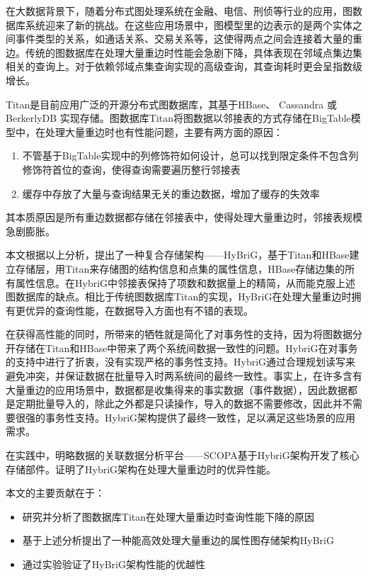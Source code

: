 
 \label{chap:conclusion}

在大数据背景下，随着分布式图处理系统在金融、电信、刑侦等行业的应用，图数据库系统迎来了新的挑战。在这些应用场景中，图模型里的边表示的是两个实体之间事件类型的关系，如通话关系、交易关系等，这使得两点之间会连接着大量的重边。传统的图数据库在处理大量重边时性能会急剧下降，具体表现在邻域点集边集相关的查询上。对于依赖邻域点集查询实现的高级查询，其查询耗时更会呈指数级增长。

Titan是目前应用广泛的开源分布式图数据库，其基于HBase、 Cassandra 或 BerkerlyDB 实现存储。图数据库Titan将图数据以邻接表的方式存储在BigTable模型中，在处理大量重边时也有性能问题，主要有两方面的原因：
\begin{enumerate}
    \item 不管基于BigTable实现中的列修饰符如何设计，总可以找到限定条件不包含列修饰符首位的查询，使得查询需要遍历整行邻接表
    \item 缓存中存放了大量与查询结果无关的重边数据，增加了缓存的失效率
\end{enumerate}
其本质原因是所有重边数据都存储在邻接表中，使得处理大量重边时，邻接表规模急剧膨胀。

本文根据以上分析，提出了一种复合存储架构——HyBriG，基于Titan和HBase建立存储层，用Titan来存储图的结构信息和点集的属性信息，HBase存储边集的所有属性信息。在HybriG中邻接表保持了项数和数据量上的精简，从而能克服上述图数据库的缺点。相比于传统图数据库Titan的实现，HyBriG在处理大量重边时拥有更优异的查询性能，在数据导入方面也有不错的表现。

在获得高性能的同时，所带来的牺牲就是简化了对事务性的支持，因为将图数据分开存储在Titan和HBase中带来了两个系统间数据一致性的问题。HybriG在对事务的支持中进行了折衷，没有实现严格的事务性支持。HybriG通过合理规划读写来避免冲突，并保证数据在批量导入时两系统间的最终一致性。事实上，在许多含有大量重边的应用场景中，数据都是收集得来的事实数据（事件数据），因此数据都是定期批量导入的，除此之外都是只读操作，导入的数据不需要修改，因此并不需要很强的事务性支持。HybriG架构提供了最终一致性，足以满足这些场景的应用需求。

在实践中，明略数据的关联数据分析平台——SCOPA基于HybriG架构开发了核心存储部件。证明了HybriG架构在处理大量重边时的优异性能。

\vspace{3mm}

本文的主要贡献在于：
\begin{itemize}
  \item 研究并分析了图数据库Titan在处理大量重边时查询性能下降的原因
  \item 基于上述分析提出了一种能高效处理大量重边的属性图存储架构HyBriG
  \item 通过实验验证了HyBriG架构性能的优越性
\end{itemize}


